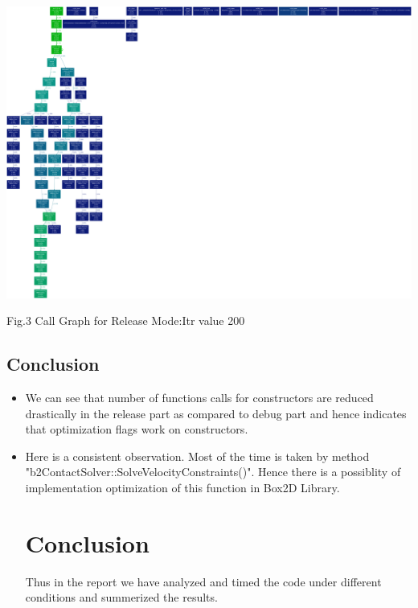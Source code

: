 \documentclass[a4paper,11pt]{article}
\begin{document}
\begin{center}
\includegraphics[scale=0.1]{./doc/rel_output200.png}
\begin{center}
Fig.3 Call Graph for Release Mode:Itr value 200
\end{center}
\end{center}

\subsection{Conclusion}
\begin{itemize}
\item{We can see that number of functions calls for constructors are reduced drastically in the release part as compared to debug part and hence indicates that optimization ﬂags work on constructors.}

\item{Here is a consistent observation. Most of the time is taken by method "b2ContactSolver::SolveVelocityConstraints()". Hence there is a possiblity of implementation optimization of this function in Box2D Library.}
\section{Conclusion}
Thus in the report we have analyzed and timed the code under different conditions and summerized the results.
\end{itemize}
\end{document}
